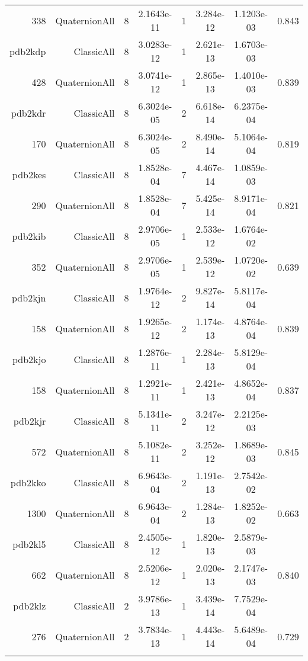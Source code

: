 \begin{xltabular}{\textwidth}{r|rcS[table-format=1.4e+2]cS[table-format=1.3e+2]S[table-format=1.4e+2]S[table-format=-1.3]}
338 & QuaternionAll & 8 & 2.1643e-11 & 1 & 3.284e-12 & 1.1203e-03 & 0.843\\  \addlinespace
pdb2kdp & ClassicAll & 8 & 3.0283e-12 & 1 & 2.621e-13 & 1.6703e-03 & \\
428 & QuaternionAll & 8 & 3.0741e-12 & 1 & 2.865e-13 & 1.4010e-03 & 0.839\\  \addlinespace
pdb2kdr & ClassicAll & 8 & 6.3024e-05 & 2 & 6.618e-14 & 6.2375e-04 & \\
170 & QuaternionAll & 8 & 6.3024e-05 & 2 & 8.490e-14 & 5.1064e-04 & 0.819\\  \addlinespace
pdb2kes & ClassicAll & 8 & 1.8528e-04 & 7 & 4.467e-14 & 1.0859e-03 & \\
290 & QuaternionAll & 8 & 1.8528e-04 & 7 & 5.425e-14 & 8.9171e-04 & 0.821\\  \addlinespace
pdb2kib & ClassicAll & 8 & 2.9706e-05 & 1 & 2.533e-12 & 1.6764e-02 & \\
352 & QuaternionAll & 8 & 2.9706e-05 & 1 & 2.539e-12 & 1.0720e-02 & 0.639\\  \addlinespace
pdb2kjn & ClassicAll & 8 & 1.9764e-12 & 2 & 9.827e-14 & 5.8117e-04 & \\
158 & QuaternionAll & 8 & 1.9265e-12 & 2 & 1.174e-13 & 4.8764e-04 & 0.839\\  \addlinespace
pdb2kjo & ClassicAll & 8 & 1.2876e-11 & 1 & 2.284e-13 & 5.8129e-04 & \\
158 & QuaternionAll & 8 & 1.2921e-11 & 1 & 2.421e-13 & 4.8652e-04 & 0.837\\  \addlinespace
pdb2kjr & ClassicAll & 8 & 5.1341e-11 & 2 & 3.247e-12 & 2.2125e-03 & \\
572 & QuaternionAll & 8 & 5.1082e-11 & 2 & 3.252e-12 & 1.8689e-03 & 0.845\\  \addlinespace
pdb2kko & ClassicAll & 8 & 6.9643e-04 & 2 & 1.191e-13 & 2.7542e-02 & \\
1300 & QuaternionAll & 8 & 6.9643e-04 & 2 & 1.284e-13 & 1.8252e-02 & 0.663\\  \addlinespace
pdb2kl5 & ClassicAll & 8 & 2.4505e-12 & 1 & 1.820e-13 & 2.5879e-03 & \\
662 & QuaternionAll & 8 & 2.5206e-12 & 1 & 2.020e-13 & 2.1747e-03 & 0.840\\  \addlinespace
pdb2klz & ClassicAll & 2 & 3.9786e-13 & 1 & 3.439e-14 & 7.7529e-04 & \\
276 & QuaternionAll & 2 & 3.7834e-13 & 1 & 4.443e-14 & 5.6489e-04 & 0.729\\  \addlinespace

\end{xltabular}
